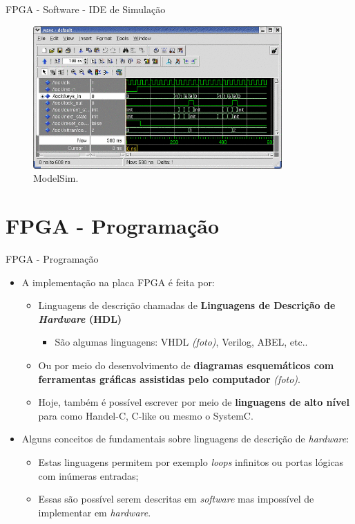 \documentclass[aspectratio=169]{beamer}
\begin{document}
	
	
	
	\begin{frame}{FPGA - Software - IDE de Simulação}
		\begin{figure}[p]
			\centering
			\includegraphics[width=0.85\textwidth]{img/fpga/modelsim.png}
			\caption{ModelSim.}
			\label{fig:modelsim}
		\end{figure}
	\end{frame}



\section{FPGA - Programação}
\begin{frame}{FPGA - Programação}
	\begin{itemize}
		\setlength\itemsep{1.0em}
		\item A implementação na placa FPGA é feita por:
		\begin{itemize}
			\setlength\itemsep{0.5em}
			\item Linguagens de descrição chamadas de \textbf{Linguagens de Descrição de \textit{Hardware} (HDL)}
			\begin{itemize}
				\item São algumas linguagens: VHDL \textit{(foto)}, Verilog, ABEL, etc..
			\end{itemize}
			
			\item Ou por meio do desenvolvimento de \textbf{diagramas esquemáticos com ferramentas gráficas assistidas pelo computador} \textit{(foto)}.
			
			\item Hoje, também é possível escrever por meio de \textbf{linguagens de alto nível} para como Handel-C, C-like ou mesmo o SystemC.
		\end{itemize}
		
		\item Alguns conceitos de fundamentais sobre linguagens de descrição de \textit{hardware}:
		\begin{itemize}
			\setlength\itemsep{0.5em}
			\item Estas linguagens permitem por exemplo \textit{loops} infinitos ou portas lógicas com inúmeras entradas;
			
			\item Essas são possível serem descritas em \textit{software} mas impossível de implementar em \textit{hardware}.
		\end{itemize}
	\end{itemize}
\end{frame}
	
\end{document}
